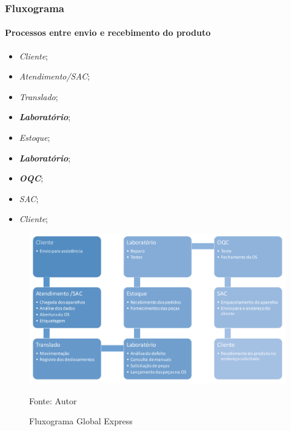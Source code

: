 \documentclass[aspectratio=169]{beamer}
\begin{document}
	\begin{frame}
		\frametitle{Fluxograma}
		\framesubtitle{Processos entre envio e recebimento do produto}
		
		\begin{minipage}[H]{.3\textwidth}
			\begin{itemize}
				\item \textit{Cliente};
				\item \textit{Atendimento/SAC};
				\item \textit{Translado};
				\item \textit{\textbf{Laboratório}};
				\item \textit{Estoque};
				\item \textit{\textbf{Laboratório}};
				\item \textit{\textbf{OQC}};
				\item \textit{SAC};
				\item \textit{Cliente};
			\end{itemize}
		\end{minipage}
		\hfill
		\begin{minipage}[H]{.65\textwidth}
			\begin{figure}
				\centering
				\caption{Fluxograma Global Express}
			
				\includegraphics[width=0.8	\linewidth]{fluxograma_global.png} 
			
				\footnotesize{Fonte: Autor}
				\label{im1}
			\end{figure}
		\end{minipage}
	\end{frame}

\end{document}
